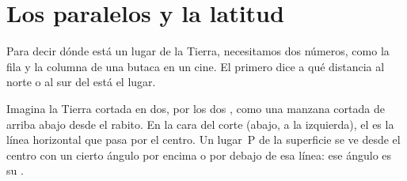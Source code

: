 \section{Los paralelos y la latitud}

Para decir dónde está un lugar de la Tierra, necesitamos dos números, como
la fila y la columna de una butaca en un cine. El primero dice a qué
distancia al norte o al sur del  está el lugar.

Imagina la Tierra cortada en dos, por los dos , como una manzana
cortada de arriba abajo desde el rabito. En la cara del corte (abajo, a la
izquierda), el  es la línea horizontal que pasa por el centro. Un
lugar~P de la superficie se ve desde el centro con un cierto ángulo por
encima o por debajo de esa línea: ese ángulo es su .

